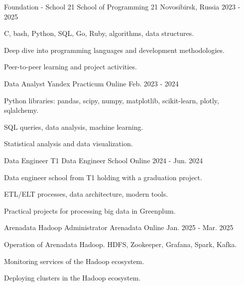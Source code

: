 \begin{cventries}

  \cventry
    {Foundation - School 21} %
    {School of Programming 21} %
    {Novosibirsk, Russia} %
    {2023 - 2025} %
    {
      \begin{cvitems} %
        \item {C, bash, Python, SQL, Go, Ruby, algorithms, data structures.}
        \item {Deep dive into programming languages and development methodologies.}
        \item {Peer-to-peer learning and project activities.}
      \end{cvitems}
    }

  \cventry
    {Data Analyst} %
    {Yandex Practicum} %
    {Online} %
    {Feb. 2023 - 2024} %
    {
      \begin{cvitems} %
        \item {Python libraries: pandas, scipy, numpy, matplotlib, scikit-learn, plotly, sqlalchemy.}
        \item {SQL queries, data analysis, machine learning.}
        \item {Statistical analysis and data visualization.}
      \end{cvitems}
    }

  \cventry
    {Data Engineer} %
    {T1 Data Engineer School} %
    {Online} %
    {2024 - Jun. 2024} %
    {
      \begin{cvitems} %
        \item {Data engineer school from T1 holding with a graduation project.}
        \item {ETL/ELT processes, data architecture, modern tools.}
        \item {Practical projects for processing big data in Greenplum.}
      \end{cvitems}
    }

  \cventry
    {Arenadata Hadoop Administrator} %
    {Arenadata} %
    {Online} %
    {Jan. 2025 - Mar. 2025} %
    {
      \begin{cvitems} %
        \item {Operation of Arenadata Hadoop. HDFS, Zookeeper, Grafana, Spark, Kafka.}
        \item {Monitoring services of the Hadoop ecosystem.}
        \item {Deploying clusters in the Hadoop ecosystem.}
      \end{cvitems}
    }


\end{cventries}
